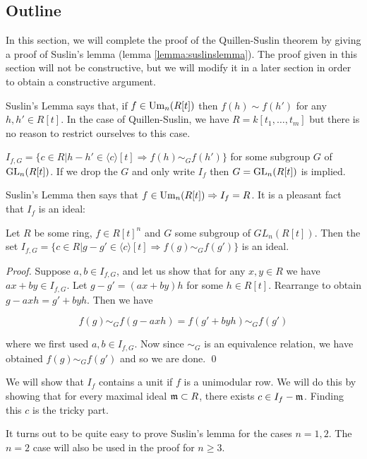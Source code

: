 \subsection{Outline}

In this section, we will complete the proof of the Quillen-Suslin theorem by giving a proof of Suslin's lemma (lemma \ref{lemma:suslinslemma}).
The proof given in this section will not be constructive, but we will modify it in a later section in order to obtain a constructive argument.


Suslin's Lemma says that, if $f \in \text{Um}_n(R[t])$ then $f(h) \sim f(h')$ for any $h, h' \in R[t]$.
In the case of Quillen-Suslin, we have $R=k[t_1, \dots, t_m]$ but there is no reason to restrict ourselves to this case.

\begin{notation}
  $I_{f,G} = \{ c \in R | h - h' \in \langle c \rangle [t] \Rightarrow f(h) \sim_G f(h')\}$ for some subgroup $G$ of $\text{GL}_n(R[t])$.
  If we drop the $G$ and only write $I_f$ then $G = \text{GL}_n(R[t])$ is implied.
\end{notation}

Suslin's Lemma then says that $f \in \text{Um}_n(R[t]) \Rightarrow I_f=R$.
It is a pleasant fact that $I_f$ is an ideal:

\begin{proposition}
  Let $R$ be some ring, $f \in R[t]^n$ and $G$ some subgroup of $GL_n(R[t])$.
  Then the set $I_{f,G} = \{ c \in R | g - g' \in \langle c \rangle[t] \Rightarrow f(g) \sim_G f(g') \}$ is an ideal.
\end{proposition}
\begin{proof}
  Suppose $a,b \in I_{f,G}$, and let us show that for any $x,y \in R$ we have $ax + by \in I_{f,G}$.
  Let $g - g' = (ax+by) h$ for some $h \in R[t]$. Rearrange to obtain $g - axh = g' + byh$.
  Then we have

  \[
    f(g) \sim_G f(g-axh) = f(g'+byh) \sim_G f(g')
  \]

  where we first used $a,b \in I_{f,G}$. Now since $\sim_G$ is an equivalence relation, we have obtained $f(g) \sim_G f(g')$ and so we are done.
  \qed
\end{proof}

We will show that $I_f$ contains a unit if $f$ is a unimodular row.
We will do this by showing that for every maximal ideal $\frak m \subset R$, there exists $c \in I_f - \frak m$.
Finding this $c$ is the tricky part.

It turns out to be quite easy to prove Suslin's lemma for the cases $n=1,2$.
The $n=2$ case will also be used in the proof for $n \geq 3$.

